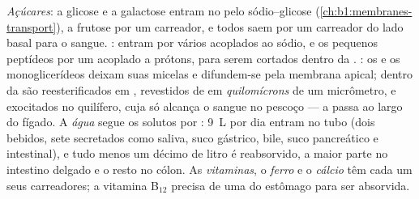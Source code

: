 \begin{proposition}\label{prop:b1:digestion-absorption:routes}
\emph{Açúcares}: a glicose e a galactose entram no  pelo
 sódio--glicose (\cref{ch:b1:membranes-transport}), a
frutose por um carreador, e todos saem por um carreador do lado basal
para o sangue. \emph{}: entram por vários 
acoplados ao sódio, e os pequenos peptídeos por um acoplado a prótons,
para serem cortados dentro da . \emph{}: os  e os monoglicerídeos deixam suas micelas e difundem-se pela
membrana apical; dentro da  são reesterificados em
, revestidos de  em \emph{quilomícrons} de um
micrômetro, e exocitados no quilífero, cuja  só alcança o sangue
no pescoço --- a  passa ao largo do fígado. A \emph{água} segue
os solutos por : \qty{9}{L} por dia entram no tubo (dois
bebidos, sete secretados como saliva, suco gástrico, bile, suco
pancreático e intestinal), e tudo menos um décimo de litro é
reabsorvido, a maior parte no intestino delgado e o resto no cólon. As
\emph{vitaminas}, o \emph{ferro} e o \emph{cálcio} têm cada um seus
carreadores; a vitamina B$_{12}$ precisa de uma  do estômago
para ser absorvida.
\end{proposition}

